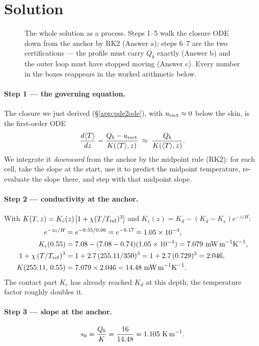 \documentclass[11pt]{report}
\newcommand{\Tm}{\langle T\rangle}
\begin{document}
\section{Solution}

\begin{figure}[htbp]\centering

\caption{The whole solution as a process. Steps 1--5 walk the closure ODE down
from the anchor by RK2 (Answer a); steps 6--7 are the two certifications ---
the profile must carry $Q_b$ exactly (Answer b) and the outer loop must have
stopped moving (Answer c). Every number in the boxes reappears in the worked
arithmetic below.}
\label{fig:solmap}
\end{figure}

\paragraph{Step 1 --- the governing equation.}
The closure we just derived (\S\ref{app:pde2ode}), with $u_{\rm rect}\approx0$ below
the skin, is the first-order ODE
\[
\frac{d\Tm}{dz}=\frac{Q_b-u_{\rm rect}}{K(\Tm,z)}\;\approx\;\frac{Q_b}{K(\Tm,z)} .
\]
We integrate it \emph{downward} from the anchor by the midpoint rule (RK2): for each
cell, take the slope at the start, use it to predict the midpoint temperature,
re-evaluate the slope there, and step with that midpoint slope.

\paragraph{Step 2 --- conductivity at the anchor.}
With $K(T,z)=K_c(z)\,[1+\chi(T/T_{\rm ref})^3]$ and $K_c(z)=K_d-(K_d-K_s)e^{-z/H}$:
\begin{align*}
e^{-z_0/H}&=e^{-0.55/0.06}=e^{-9.17}=1.05\times10^{-4},\\
K_c(0.55)&=7.08-(7.08-0.74)(1.05\times10^{-4})=7.079\ \text{mW\,m}^{-1}\text{K}^{-1},\\
1+\chi\,(T/T_{\rm ref})^3&=1+2.7\,(255.11/350)^3=1+2.7\,(0.729)^3=2.046,\\
K(255.11,\,0.55)&=7.079\times2.046=14.48\ \text{mW\,m}^{-1}\text{K}^{-1}.
\end{align*}
The contact part $K_c$ has already reached $K_d$ at this depth; the temperature
factor roughly doubles it.

\paragraph{Step 3 --- slope at the anchor.}
\[
s_0=\frac{Q_b}{K}=\frac{16}{14.48}=1.105\ \text{K\,m}^{-1} .
\]
\end{document}
